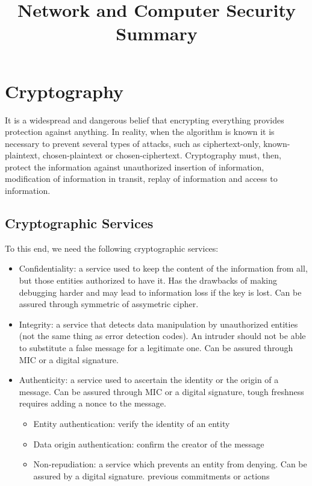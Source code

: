 \documentclass[10pt,a4paper]{report}
\title{\LARGE{Network and Computer Security } \\ \vspace{0.5cm} \normalsize{Summary}}
\date{}
\begin{document}
\maketitle
\tableofcontents

\chapter{Cryptography}
It is a widespread and dangerous belief that encrypting everything provides protection against anything. In reality, when the algorithm is known it is necessary to prevent several types of attacks, such as ciphertext-only, known-plaintext, chosen-plaintext or chosen-ciphertext. Cryptography must, then, protect the information against unauthorized insertion of information, modification of information in transit, replay of information and access to information.
\section{Cryptographic Services}
To this end, we need the following cryptographic services:
\begin{itemize}
\item Confidentiality: a service used to keep the content of the information from all, but those entities authorized to have it. Has the drawbacks of making debugging harder and may lead to information loss if the key is lost. Can be assured through symmetric of assymetric cipher.
\item Integrity: a service that detects data manipulation by unauthorized entities (not the same thing as error detection codes). An intruder should not be able to substitute a false message for a legitimate one. Can be assured through MIC or a digital signature.
\item Authenticity: a service used to ascertain the identity or the origin of a message. Can be assured through MIC or a digital signature, tough freshness requires adding a nonce to the message.
\begin{itemize}
\item Entity authentication: verify the identity of an entity
\item Data origin authentication: confirm the creator of the message
\item Non-repudiation: a service which prevents an entity from denying. Can be assured by a digital signature.
previous commitments or actions
\end{itemize}
\end{itemize}
\end{document}
